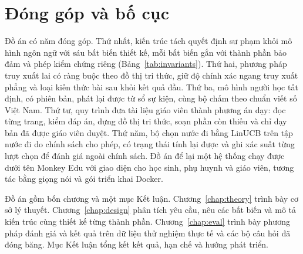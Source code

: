 \section{Đóng góp và bố cục}
Đồ án có năm đóng góp. Thứ nhất, kiến trúc tách quyết định sư phạm khỏi mô hình ngôn ngữ với sáu bất biến thiết kế, mỗi bất biến gắn với thành phần bảo đảm và phép kiểm chứng riêng (Bảng~\ref{tab:invariants}). Thứ hai, phương pháp truy xuất lai có ràng buộc theo đồ thị tri thức, giữ độ chính xác ngang truy xuất phẳng và loại kiến thức bài sau khỏi kết quả đầu. Thứ ba, mô hình người học tất định, có phiên bản, phát lại được từ sổ sự kiện, cùng bộ chấm theo chuẩn viết số Việt Nam. Thứ tư, quy trình đưa tài liệu giáo viên thành phương án dạy: đọc từng trang, kiểm đáp án, dựng đồ thị tri thức, soạn phần còn thiếu và chỉ dạy bản đã được giáo viên duyệt. Thứ năm, bộ chọn nước đi bằng LinUCB trên tập nước đi do chính sách cho phép, có trạng thái tính lại được và ghi xác suất từng lượt chọn để đánh giá ngoài chính sách. Đồ án để lại một hệ thống chạy được dưới tên Monkey Edu với giao diện cho học sinh, phụ huynh và giáo viên, tương tác bằng giọng nói và gói triển khai Docker.

Đồ án gồm bốn chương và một mục Kết luận. Chương~\ref{chap:theory} trình bày cơ sở lý thuyết. Chương~\ref{chap:design} phân tích yêu cầu, nêu các bất biến và mô tả kiến trúc cùng thiết kế từng thành phần. Chương~\ref{chap:eval} trình bày phương pháp đánh giá và kết quả trên dữ liệu thử nghiệm thực tế và các bộ câu hỏi đã đóng băng. Mục Kết luận tổng kết kết quả, hạn chế và hướng phát triển.
